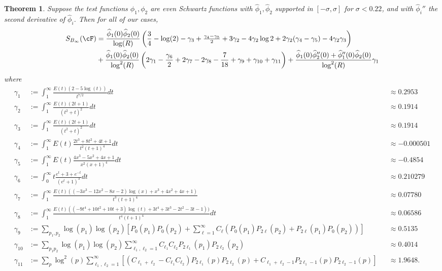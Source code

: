 \documentclass[11pt, reqno]{amsart}
\newtheorem{theorem}{Theorem}[section]
\theoremstyle{definition}
\theoremstyle{remark}
\numberwithin{equation}{section}
\renewcommand{\hat}{\widehat}
\begin{document}
    
\begin{theorem} \label{thm:S_infty}
   Suppose the test functions $\phi_1,\phi_2$ are even Schwartz functions with $\hat\phi_1, \hat\phi_2$ supported in $[-\sigma,\sigma]$ for $\sigma<0.22$, and with $\hat\phi_i''$ the second derivative of $\hat\phi_i$. Then for all of our cases,
\small\begin{align*}
    S_{B_\infty}(\cF) &= \frac{\hat\phi_1(0)\hat\phi_2(0)}{\log(R)}
\left(\frac{3}{4}-\log(2)-\gamma_3+\tfrac{\gamma_4-\gamma_5}{2}
+3\gamma_2-4\gamma_2\log 2+2\gamma_2(\gamma_4-\gamma_5)-4\gamma_2\gamma_3\right) \\ &+\frac{\hat\phi_1(0)\hat\phi_2(0)}{\log^2(R)}
\left({2\gamma_1-\frac{\gamma_6}{2}+2\gamma_7-2\gamma_8-\frac{7}{18}+\gamma_9+\gamma_{10}+\gamma_{11}}\right)+\frac{\hat\phi_1(0)\hat\phi_2''(0)+\hat\phi_1''(0)\hat\phi_2(0) }{\log^2(R)}\gamma_1
\end{align*} \normalsize
where 
\small\begin{align*}
    \gamma_{1}&:= \int_{1}^\infty \frac{E(t)(2-5\log(t))}{t^{7/2}}dt &&\approx 0.2953\\
    \gamma_2 &:= 
     \int_1^\infty \frac{E(t)(2t+1)}{(t^2+t)^2}dt &&\approx 0.1914\\
      \gamma_3 &:= \int_1^\infty \frac{E(t)(2t+1)}{(t^2+t)^2}dt &&\approx 0.1914\\
      \gamma_4&:=\int_1^\infty E(t)\frac{2t^3+8t^2+4t+1}{t^2(t+1)^4}dt &&\approx -0.000501\\
      \gamma_5 &:=\int_1^\infty E(t)\frac{4x^{3} - 5x^{2} + 4x + 1}{x^{2} \left(x + 1\right)^{4}}dt &&\approx -0.4854\\
      \gamma_6 &:= \int_0^\infty t\frac{e^t+3+e^{-t}}{(e^t+1)^3}dt&&\approx 0.210279 \\
      \gamma_7 &:= \int_1^\infty \frac{E(t)((-3x^3-12x^2-8x-2)\log(x)+x^3+4x^2+4x+1)}{t^3(t+1)^4} &&\approx 0.07780\\
      \gamma_8 &:= \int_1^\infty \frac{E(t)((-9t^4+10t^2+10t+3)\log(t)+3t^4+3t^3-2t^2-3t-1))}{t^4(t+1)^4}dt &&\approx 0.06586\\
      \gamma_9 &:=\sum_{p_1, p_2} \log \left(p_1\right) \log(p_2)\left[P_0\left(p_1\right) P_0\left(p_2\right)+\sum_{\ell=1}^{\infty} C_\ell\left(P_0\left(p_1\right) P_{2 \ell}\left(p_2\right)+P_{2 \ell}\left(p_1\right) P_0\left(p_2\right)\right)\right]&&\approx 0.5135 \\
      \gamma_{10} &:= \sum_{p_1 p_2} {\log (p_1) \log(p_2)} \sum_{\ell_1, \ell_2=1}^{\infty} C_{\ell_1} C_{\ell_2} P_{2\ell_1}(p_1) P_{2\ell_2}(p_2) &&\approx 0.4014\\
      \gamma_{11} &:=\sum_p \log^2(p)\sum_{\ell_1, \ell_2=1}^{\infty}\left[\left(C_{\ell_1+\ell_2}-C_{\ell_1} C_{\ell_2}\right) P_{2\ell_1}\left(p\right) P_{2\ell_2}(p)+C_{\ell_1+\ell_2-1} P_{2\ell_1-1}(p) P_{2 \ell_2-1}(p)\right] &&\approx 1.9648.
\end{align*}\normalsize
\end{theorem}
\end{document}
